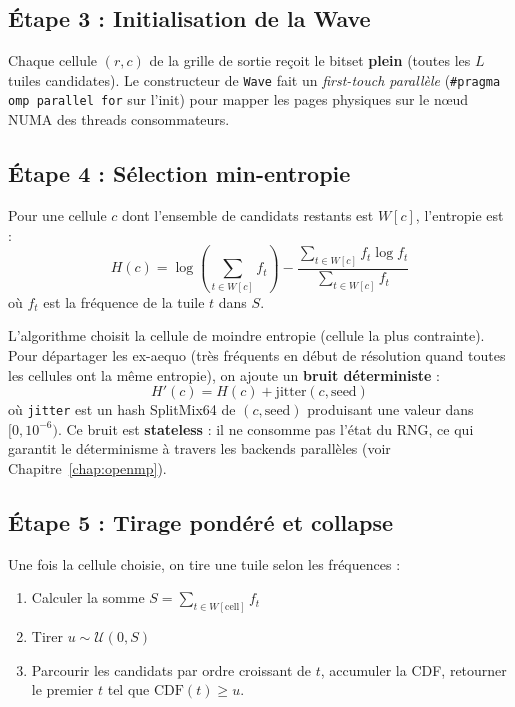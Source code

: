 \subsection{Étape 3 : Initialisation de la Wave}

Chaque cellule $(r, c)$ de la grille de sortie reçoit le bitset \textbf{plein} (toutes les $L$ tuiles candidates). Le constructeur de \texttt{Wave} fait un \textit{first-touch parallèle} (\texttt{\#pragma omp parallel for} sur l'init) pour mapper les pages physiques sur le nœud NUMA des threads consommateurs.

\subsection{Étape 4 : Sélection min-entropie}

\begin{definition}
Pour une cellule $c$ dont l'ensemble de candidats restants est $W[c]$, l'entropie est :
\[
H(c) = \log\left(\sum_{t \in W[c]} f_t\right) - \frac{\sum_{t \in W[c]} f_t \log f_t}{\sum_{t \in W[c]} f_t}
\]
où $f_t$ est la fréquence de la tuile $t$ dans $S$.
\end{definition}

L'algorithme choisit la cellule de moindre entropie (cellule la plus contrainte). Pour départager les ex-aequo (très fréquents en début de résolution quand toutes les cellules ont la même entropie), on ajoute un \textbf{bruit déterministe} :
\[
H'(c) = H(c) + \text{jitter}(c, \text{seed})
\]
où \texttt{jitter} est un hash SplitMix64 de $(c, \text{seed})$ produisant une valeur dans $[0, 10^{-6})$. Ce bruit est \textbf{stateless} : il ne consomme pas l'état du RNG, ce qui garantit le déterminisme à travers les backends parallèles (voir Chapitre~\ref{chap:openmp}).

\subsection{Étape 5 : Tirage pondéré et collapse}

Une fois la cellule choisie, on tire une tuile selon les fréquences :
\begin{enumerate}
    \item Calculer la somme $S = \sum_{t \in W[\text{cell}]} f_t$
    \item Tirer $u \sim \mathcal{U}(0, S)$
    \item Parcourir les candidats par ordre croissant de $t$, accumuler la CDF, retourner le premier $t$ tel que $\text{CDF}(t) \geq u$.
\end{enumerate}


